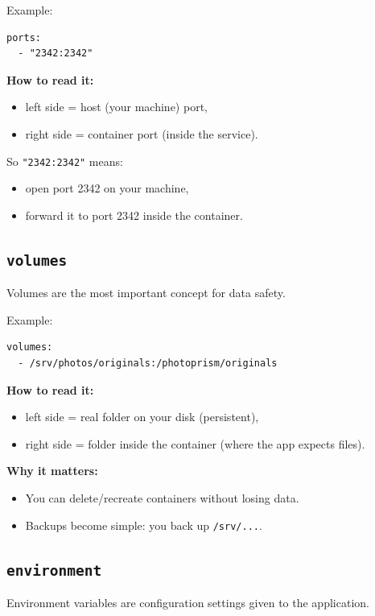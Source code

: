 Example:
\begin{lstlisting}
ports:
  - "2342:2342"
\end{lstlisting}

\textbf{How to read it:}
\begin{itemize}[leftmargin=*]
  \item left side = host (your machine) port,
  \item right side = container port (inside the service).
\end{itemize}

So \texttt{"2342:2342"} means:
\begin{itemize}[leftmargin=*]
  \item open port 2342 on your machine,
  \item forward it to port 2342 inside the container.
\end{itemize}

\subsection{\texttt{volumes}}
Volumes are the most important concept for data safety.

Example:
\begin{lstlisting}
volumes:
  - /srv/photos/originals:/photoprism/originals
\end{lstlisting}

\textbf{How to read it:}
\begin{itemize}[leftmargin=*]
  \item left side = real folder on your disk (persistent),
  \item right side = folder inside the container (where the app expects files).
\end{itemize}

\textbf{Why it matters:}
\begin{itemize}[leftmargin=*]
  \item You can delete/recreate containers without losing data.
  \item Backups become simple: you back up \texttt{/srv/...}.
\end{itemize}


\subsection{\texttt{environment}}
Environment variables are configuration settings given to the application.

